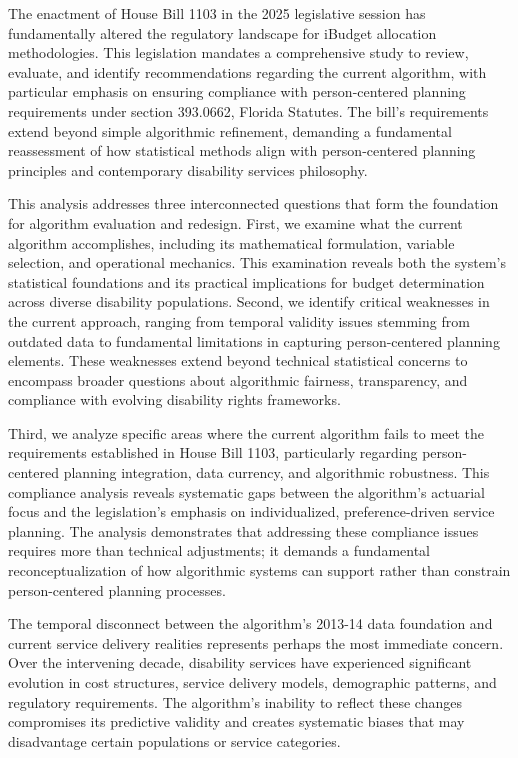 \documentclass[12pt]{article}
\begin{document}
The enactment of House Bill 1103 in the 2025 legislative session has fundamentally altered the regulatory landscape for iBudget allocation methodologies. This legislation mandates a comprehensive study to review, evaluate, and identify recommendations regarding the current algorithm, with particular emphasis on ensuring compliance with person-centered planning requirements under section 393.0662, Florida Statutes. The bill's requirements extend beyond simple algorithmic refinement, demanding a fundamental reassessment of how statistical methods align with person-centered planning principles and contemporary disability services philosophy.

This analysis addresses three interconnected questions that form the foundation for algorithm evaluation and redesign. First, we examine what the current algorithm accomplishes, including its mathematical formulation, variable selection, and operational mechanics. This examination reveals both the system's statistical foundations and its practical implications for budget determination across diverse disability populations. Second, we identify critical weaknesses in the current approach, ranging from temporal validity issues stemming from outdated data to fundamental limitations in capturing person-centered planning elements. These weaknesses extend beyond technical statistical concerns to encompass broader questions about algorithmic fairness, transparency, and compliance with evolving disability rights frameworks.

Third, we analyze specific areas where the current algorithm fails to meet the requirements established in House Bill 1103, particularly regarding person-centered planning integration, data currency, and algorithmic robustness. This compliance analysis reveals systematic gaps between the algorithm's actuarial focus and the legislation's emphasis on individualized, preference-driven service planning. The analysis demonstrates that addressing these compliance issues requires more than technical adjustments; it demands a fundamental reconceptualization of how algorithmic systems can support rather than constrain person-centered planning processes.

The temporal disconnect between the algorithm's 2013-14 data foundation and current service delivery realities represents perhaps the most immediate concern. Over the intervening decade, disability services have experienced significant evolution in cost structures, service delivery models, demographic patterns, and regulatory requirements. The algorithm's inability to reflect these changes compromises its predictive validity and creates systematic biases that may disadvantage certain populations or service categories.
\end{document}
